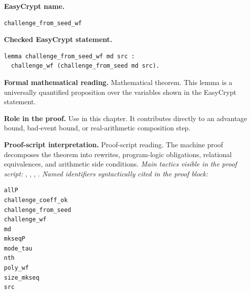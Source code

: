 \begin{formaltheorem}
\noindent\textbf{EasyCrypt name.}
\begin{lstlisting}[language=EasyCrypt,basicstyle=\ttfamily\scriptsize]
challenge_from_seed_wf
\end{lstlisting}
\noindent\textbf{Checked EasyCrypt statement.}
\begin{lstlisting}[language=EasyCrypt,basicstyle=\ttfamily\scriptsize]
lemma challenge_from_seed_wf md src :
  challenge_wf (challenge_from_seed md src).
\end{lstlisting}
\noindent\textbf{Formal mathematical reading.}
Mathematical theorem. This lemma is a universally quantified proposition over the variables shown in the EasyCrypt statement.

\noindent\textbf{Role in the proof.}
Use in this chapter. It contributes directly to an advantage bound, bad-event bound, or real-arithmetic composition step.

\noindent\textbf{Proof-script interpretation.}
Proof-script reading. The machine proof decomposes the theorem into rewrites, program-logic obligations, relational equivalences, and arithmetic side conditions.
\emph{Main tactics visible in the proof script:} , , , .
\emph{Named identifiers syntactically cited in the proof block:}
\begin{lstlisting}[language=EasyCrypt,basicstyle=\ttfamily\scriptsize]
allP
challenge_coeff_ok
challenge_from_seed
challenge_wf
md
mkseqP
mode_tau
nth
poly_wf
size_mkseq
src
\end{lstlisting}

\end{formaltheorem}


